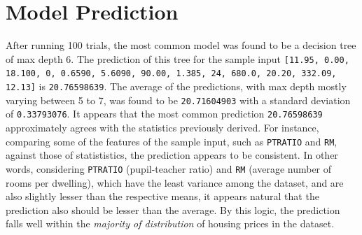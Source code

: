 \documentclass{article}
\begin{document}
	\section{Model Prediction}
	After running 100 trials, the most common model was found to be a decision tree of max depth 6. The prediction of this tree for the sample input \texttt{[11.95, 0.00, 18.100, 0, 0.6590, 5.6090, 90.00, 1.385, 24, 680.0, 20.20, 332.09, 12.13]} is \texttt{20.76598639}. The average of the predictions, with max depth mostly varying between 5 to 7, was found to be \texttt{20.71604903} with a standard deviation of \texttt{0.33793076}. It appears that the most common prediction \texttt{20.76598639} approximately agrees with the statistics previously derived. For instance, comparing some  of the features of the sample input, such as \texttt{PTRATIO} and \texttt{RM}, against those of statististics, the prediction appears to be consistent. In other words, considering \texttt{PTRATIO} (pupil-teacher ratio) and \texttt{RM} (average number of rooms per dwelling), which have the least variance among the dataset, and are also slightly lesser than the respective means, it appears natural that the prediction also should be lesser than the average. By this logic, the prediction falls well within the \emph{majority of distribution} of housing prices in the dataset.
\end{document}
